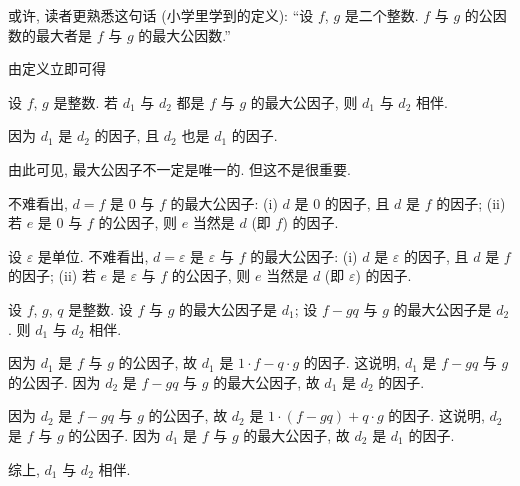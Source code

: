 \begin{remark}
    或许, 读者更熟悉这句话 (小学里学到的定义): ``设 $f$, $g$ 是二个整数. $f$ 与 $g$ 的公因数的最大者是 $f$ 与 $g$ 的最大公因数.''
\end{remark}

由定义立即可得
\begin{proposition}
    设 $f$, $g$ 是整数. 若 $d_1$ 与 $d_2$ 都是 $f$ 与 $g$ 的最大公因子, 则 $d_1$ 与 $d_2$ 相伴.
\end{proposition}

\begin{pf}
    因为 $d_1$ 是 $d_2$ 的因子, 且 $d_2$ 也是 $d_1$ 的因子.
\end{pf}

\begin{remark}
    由此可见, 最大公因子不一定是唯一的. 但这不是很重要.
\end{remark}

\begin{example}
    不难看出, $d = f$ 是 $0$ 与 $f$ 的最大公因子: (i) $d$ 是 $0$ 的因子, 且 $d$ 是 $f$ 的因子; (ii) 若 $e$ 是 $0$ 与 $f$ 的公因子, 则 $e$ 当然是 $d$ (即 $f$) 的因子.
\end{example}

\begin{example}
    设 $\varepsilon$ 是单位. 不难看出, $d = \varepsilon$ 是 $\varepsilon$ 与 $f$ 的最大公因子: (i) $d$ 是 $\varepsilon$ 的因子, 且 $d$ 是 $f$ 的因子; (ii) 若 $e$ 是 $\varepsilon$ 与 $f$ 的公因子, 则 $e$ 当然是 $d$ (即 $\varepsilon$) 的因子.
\end{example}

\begin{proposition}
    设 $f$, $g$, $q$ 是整数. 设 $f$ 与 $g$ 的最大公因子是 $d_1$; 设 $f - gq$ 与 $g$ 的最大公因子是 $d_2$. 则 $d_1$ 与 $d_2$ 相伴.
\end{proposition}

\begin{pf}
    因为 $d_1$ 是 $f$ 与 $g$ 的公因子, 故 $d_1$ 是 $1 \cdot f - q \cdot g$ 的因子. 这说明, $d_1$ 是 $f - gq$ 与 $g$ 的公因子. 因为 $d_2$ 是 $f - gq$ 与 $g$ 的最大公因子, 故 $d_1$ 是 $d_2$ 的因子.

    因为 $d_2$ 是 $f - gq$ 与 $g$ 的公因子, 故 $d_2$ 是 $1 \cdot (f - gq) + q \cdot g$ 的因子. 这说明, $d_2$ 是 $f$ 与 $g$ 的公因子. 因为 $d_1$ 是 $f$ 与 $g$ 的最大公因子, 故 $d_2$ 是 $d_1$ 的因子.

    综上, $d_1$ 与 $d_2$ 相伴.
\end{pf}

